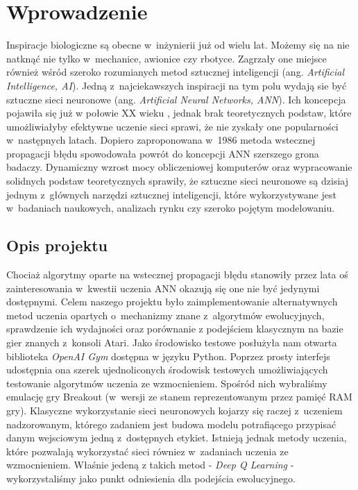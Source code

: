 \chapter{Wprowadzenie}

Inspiracje biologiczne są obecne w~inżynierii już od wielu lat. Możemy się na nie natknąć nie tylko w~mechanice, awionice czy rbotyce. Zagrzały one miejsce również wśród szeroko rozumianych metod sztucznej inteligencji (ang. \textit{Artificial Intelligence, AI}). Jedną z~najciekawszych inspiracji na tym polu wydają sie być sztuczne sieci neuronowe (ang. \textit{Artificial Neural Networks, ANN}). Ich koncepcja pojawiła się już w połowie XX wieku \cite{perceptron}, jednak brak teoretycznych podstaw, które umożliwiałyby efektywne uczenie sieci sprawi, że nie zyskały one popularności w~następnych latach. Dopiero zaproponowana w~1986 metoda wstecznej propagacji błędu \cite{backprop} spowodowała powrót do koncepcji ANN szerszego grona badaczy. Dynamiczny wzrost mocy obliczeniowej komputerów oraz wypracowanie solidnych podstaw teoretycznych sprawiły, że sztuczne sieci neuronowe są dzisiaj jednym z~głównych narzędzi sztucznej inteligencji, które wykorzystywane jest w~badaniach naukowych, analizach rynku czy szeroko pojętym modelowaniu.

\section*{Opis projektu}

Chociaż algorytmy oparte na wstecznej propagacji błędu stanowiły przez lata oś zainteresowania w~kwestii uczenia ANN okazują się one nie być jedynymi dostępnymi. Celem naszego projektu było zaimplementowanie alternatywnych metod uczenia opartych o~mechanizmy znane z~algorytmów ewolucyjnych, sprawdzenie ich wydajności oraz porównanie z podejściem klasycznym na bazie gier znanych z~konsoli Atari. Jako środowisko testowe posłużyła nam otwarta biblioteka \textit{OpenAI Gym} dostępna w języku Python. Poprzez prosty interfejs udostępnia ona szerek ujednoliconych środowisk testowych umożliwiających testowanie algorytmów uczenia ze wzmocnieniem. Spośród nich wybraliśmy emulację gry Breakout (w~wersji ze stanem reprezentowanym przez pamięć RAM gry).  Klasyczne wykorzystanie sieci neuronowych kojarzy się raczej z~uczeniem nadzorowanym, którego zadaniem jest budowa modelu potrafiącego przypisać danym wejsciowym jedną z~dostępnych etykiet. Istnieją jednak metody uczenia, które pozwalają wykorzystać sieci równiez w~zadaniach uczenia ze wzmocnieniem. Właśnie jedeną z takich metod - \textit{Deep Q Learning} - wykorzystaliśmy jako punkt odniesienia dla podejścia ewolucyjnego.

